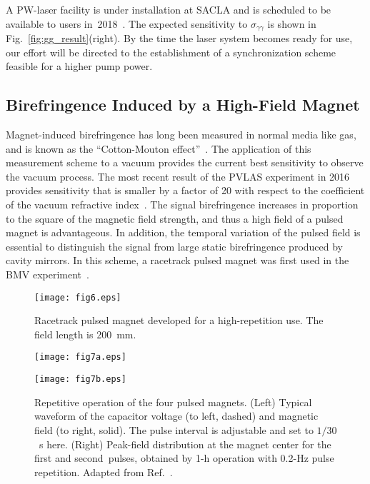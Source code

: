 \documentclass[10pt,a4paper]{article}%
\begin{document}
A PW-laser facility is under installation at SACLA and is scheduled to be available to users in~2018~\cite{double}.
The expected sensitivity to $\sigma_{\gamma \gamma}$ is shown in Fig.~\ref{fig:gg_result}(right).
By the time the laser system becomes ready for use, our effort will be directed to the establishment of a synchronization scheme feasible for a higher pump power.

\subsection{Birefringence Induced by a High-Field Magnet}\label{sec:vmb}

Magnet-induced birefringence has long been measured in normal media like gas, and is known as the ``Cotton-Mouton effect''~\cite{cm}.
The application of this measurement scheme to a vacuum provides the current best sensitivity to observe the vacuum process.
The most recent result of the PVLAS experiment in 2016 provides sensitivity that is smaller by a factor of 20 with respect to the coefficient of the vacuum refractive index~\cite{pvlas}.
The signal birefringence increases in proportion to the square of the magnetic field strength, and thus a high field of a pulsed magnet is advantageous.
In addition, the temporal variation of the pulsed field is essential to distinguish the signal from large static birefringence produced by cavity mirrors.
In this scheme, a racetrack pulsed magnet was first used in the BMV experiment~\cite{bmv}.

\begin{figure}[!t]
\centering
\texttt{[image: fig6.eps]}
\caption{
Racetrack pulsed magnet developed for a high-repetition use.
The field length is 200~mm.
\label{fig:mag}}
\end{figure}   

\begin{figure}[!t]
\begin{minipage}{0.5\hsize}
\centering
\texttt{[image: fig7a.eps]}
\end{minipage}
\begin{minipage}{0.5\hsize}
\centering
\texttt{[image: fig7b.eps]}
\end{minipage}
\caption{
Repetitive operation of the four pulsed magnets.
(Left)
Typical waveform of the capacitor voltage (to left, dashed) and magnetic field (to right, solid).
The pulse interval is adjustable and set to $1/30$~s here.
(Right)
Peak-field distribution at the magnet center for the first and second~pulses, obtained by 1-h operation with 0.2-Hz pulse repetition.
Adapted from Ref.~\cite{pulse_mag}.
\label{fig:rep}}
\end{figure}   
\end{document}

